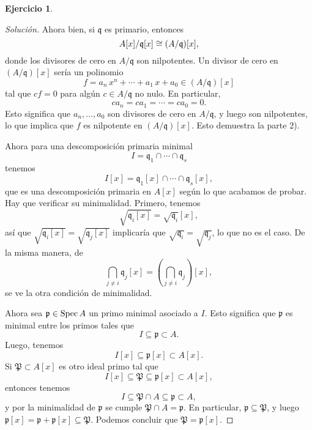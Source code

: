 \documentclass{article}
\theoremstyle{definition}
\newtheorem{ejerc}{Ejercicio}
\newenvironment{solucion}{\begin{proof}[Solución]}{\end{proof}}
\begin{document}
\begin{ejerc}
\begin{solucion}
    Ahora bien, si $\mathfrak{q}$ es primario, entonces
    $$A[x] / \mathfrak{q} [x] \cong (A/\mathfrak{q})[x],$$
    donde los divisores de cero en $A/\mathfrak{q}$ son nilpotentes. Un divisor
    de cero en $(A/\mathfrak{q}) [x]$ sería un polinomio
    $$f = a_n\,x^n + \cdots + a_1\,x + a_0 \in (A/\mathfrak{q}) [x]$$
    tal que $c f = 0$ para algún $c \in A/\mathfrak{q}$ no nulo. En particular,
    $$c a_n = c a_1 = \cdots = c a_0 = 0.$$
    Esto significa que $a_n, \ldots, a_0$ son divisores de cero en
    $A/\mathfrak{q}$, y luego son nilpotentes, lo que implica que $f$ es
    nilpotente en $(A/\mathfrak{q}) [x]$. Esto demuestra la parte 2).

    \vspace{1em}

    Ahora para una descomposición primaria minimal
    $$I = \mathfrak{q}_1 \cap \cdots \cap \mathfrak{q}_s$$
    tenemos
    $$I [x] = \mathfrak{q}_1 [x] \cap \cdots \cap \mathfrak{q}_s [x],$$
    que es una descomposición primaria en $A [x]$ según lo que acabamos de
    probar. Hay que verificar su minimalidad. Primero, tenemos
    $$\sqrt{\mathfrak{q}_i [x]} = \sqrt{\mathfrak{q}_i} [x],$$
    así que $\sqrt{\mathfrak{q}_i [x]} = \sqrt{\mathfrak{q}_j [x]}$ implicaría
    que $\sqrt{\mathfrak{q}_i} = \sqrt{\mathfrak{q}_j}$, lo que no es el
    caso. De la misma manera, de
    \[ \bigcap_{j\ne i} \mathfrak{q}_j [x] =
       \left(\bigcap_{j\ne i} \mathfrak{q}_j\right) [x], \]
    se ve la otra condición de minimalidad.

    Ahora sea $\mathfrak{p} \in \operatorname{Spec} A$ un primo minimal asociado a $I$. Esto
    significa que $\mathfrak{p}$ es minimal entre los primos tales que
    $$I \subseteq \mathfrak{p} \subset A.$$
    Luego, tenemos
    $$I [x] \subseteq \mathfrak{p} [x] \subset A [x].$$
    Si $\mathfrak{P} \subset A [x]$ es otro ideal primo tal que
    $$I [x] \subseteq \mathfrak{P} \subseteq \mathfrak{p} [x] \subset A [x],$$
    entonces tenemos
    $$I \subseteq \mathfrak{P} \cap A \subseteq \mathfrak{p} \subset A,$$
    y por la minimalidad de $\mathfrak{p}$ se cumple
    $\mathfrak{P} \cap A = \mathfrak{p}$. En particular,
    $\mathfrak{p} \subseteq \mathfrak{P}$, y luego
    $\mathfrak{p} [x] = \mathfrak{p} + \mathfrak{p} [x] \subseteq
    \mathfrak{P}$. Podemos concluir que $\mathfrak{P} = \mathfrak{p} [x]$.
  \end{solucion}\fi
\end{ejerc}
\end{document}
